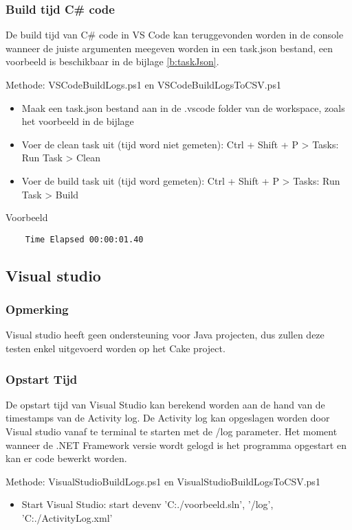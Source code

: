 \subsubsection{Build tijd C\# code}
De build tijd van C\# code in VS Code kan teruggevonden worden in de console wanneer de juiste argumenten meegeven worden in een task.json bestand, een voorbeeld is beschikbaar in de bijlage \ref{b:taskJson}.

Methode: VSCodeBuildLogs.ps1 en VSCodeBuildLogsToCSV.ps1
\begin{itemize}
	\item	Maak een task.json bestand aan in de .vscode folder van de workspace, zoals het voorbeeld in de bijlage
	\item Voer de clean task uit (tijd word niet gemeten): Ctrl + Shift + P > Tasks: Run Task > Clean
	\item Voer de build task uit (tijd word gemeten): Ctrl + Shift + P > Tasks: Run Task > Build
\end{itemize}

Voorbeeld
\vspace{\verbatimOffset}
\begin{verbatim}
    Time Elapsed 00:00:01.40
\end{verbatim}

\subsection{Visual studio}

\subsubsection{Opmerking}
Visual studio heeft geen ondersteuning voor Java projecten, dus zullen deze testen enkel uitgevoerd worden op het Cake project.

\subsubsection{Opstart Tijd}
De opstart tijd van Visual Studio kan berekend worden aan de hand van de timestamps van de Activity log. De Activity log kan opgeslagen worden door Visual studio vanaf te terminal te starten met de /log parameter. Het moment wanneer de .NET Framework versie wordt gelogd is het programma opgestart en kan er code bewerkt worden.

Methode: VisualStudioBuildLogs.ps1 en VisualStudioBuildLogsToCSV.ps1
\begin{itemize}
	\item Start Visual Studio: start devenv 'C:./voorbeeld.sln', '/log', 'C:./ActivityLog.xml'
\end{itemize}

